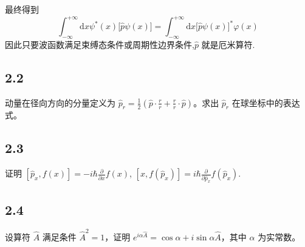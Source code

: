 最终得到
\begin{equation}
    \int_{-\infty}^{+\infty}{\mathrm{d}x}\psi ^*(x)\bigl[ \hat{p}\psi (x) \bigr] =\int_{-\infty}^{+\infty}{\mathrm{d}x}\bigl[ \hat{p}\psi (x) \bigr] ^*\varphi (x)
\end{equation}
因此只要波函数满足束缚态条件或周期性边界条件,$\hat{p}$ 就是厄米算符.

\subsection{2.2}
动量在径向方向的分量定义为 $\hat{p}_r = \frac{1}{2} \left( \hat{p} \cdot \frac{r}{r} + \frac{r}{r} \cdot \hat{p} \right)$。求出 $\hat{p}_r$ 在球坐标中的表达式。



\subsection{2.3}
证明 $[\hat{p}_x, f(x)] = -i\hbar \frac{\partial}{\partial x} f(x)$, $[x, f(\hat{p}_x)] = i\hbar \frac{\partial}{\partial \hat{p}_x} f(\hat{p}_x)$.

\newpage
\subsection{2.4}
设算符 $\hat{A}$ 满足条件 $\hat{A}^2 = 1$，证明 $e^{i\alpha \hat{A}} = \cos \alpha + i \sin \alpha \hat{A}$，其中 $\alpha$ 为实常数。

